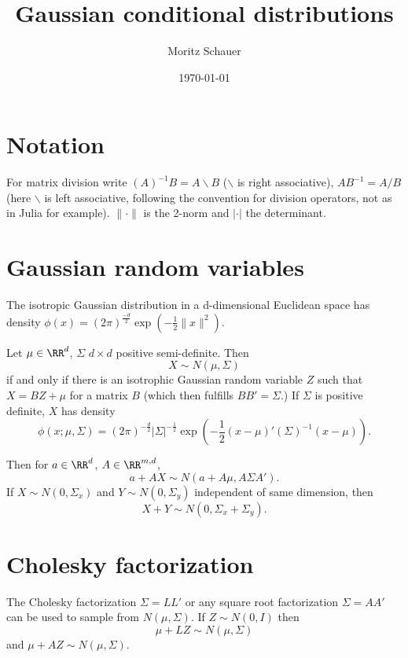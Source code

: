\documentclass[11pt]{article}
\title{Gaussian conditional distributions}
\author{Moritz Schauer}%
\date{\today}
\begin{document}
\maketitle

\section{Notation}
For matrix division  write $(A)^{-1}B = A\backslash B$ ($\backslash$ is right associative),
$AB^{-1} = A/B$ (here $\backslash$ is left associative, following the convention for division operators, not as in Julia for example). $\|\cdot\|$ is the 2-norm and $|\cdot |$ the determinant.



\section{Gaussian random variables}
The isotropic Gaussian distribution in a d-dimensional Euclidean space has density  $\phi(x) = (2\pi)^{\frac{-d}{2}}\exp(-\frac12\|x\|^2).$



Let $\mu \in \RR^d$, $\Sigma$ $d\times d$ positive semi-definite.
Then
\[
X \sim N(\mu, \Sigma)
\]
if and only if there is an isotrophic Gaussian random variable $Z$ such that $X = BZ + \mu$ for a matrix $B$ (which then fulfills $BB'= \Sigma$.) If $\Sigma$ is positive definite, $X$ has density
\[
\phi(x; \mu, \Sigma) = (2\pi)^{-\frac{d}{2}}|\Sigma|^{-\frac12}\exp(-\frac12 (x-\mu)'(\Sigma)^{-1} (x-\mu)).
\]

Then for $a \in \RR^d$, $A \in \RR^{m, d}$,
\[
a + A X \sim N(a + A \mu, A \Sigma A').
\]
If $X \sim N(0, \Sigma_x)$ and $Y \sim N(0, \Sigma_y)$ independent of same dimension, then 
\[
X + Y \sim N(0, \Sigma_x + \Sigma_y). 
\]
\section{Cholesky factorization}
 
The Cholesky factorization $\Sigma = L L'$ or any square root factorization $\Sigma = AA'$ can be used to sample from $
 N(\mu, \Sigma).$
If  $Z \sim N(0, I)$ then
\[
\mu + L Z \sim N(\mu, \Sigma)
\]
and $\mu + A Z \sim N(\mu, \Sigma)$.
\end{document}
